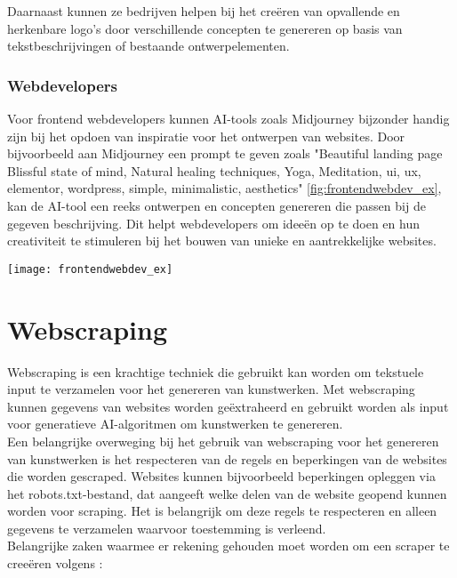 Daarnaast kunnen ze bedrijven helpen bij het creëren van opvallende en herkenbare logo's door verschillende concepten te genereren op basis van tekstbeschrijvingen of bestaande ontwerpelementen. 

\subsubsection{Webdevelopers}
Voor frontend webdevelopers kunnen AI-tools zoals Midjourney bijzonder handig zijn bij het opdoen van inspiratie voor het ontwerpen van websites. Door bijvoorbeeld aan Midjourney een prompt te geven zoals "Beautiful landing page Blissful state of mind, Natural healing techniques, Yoga, Meditation, ui, ux, elementor, wordpress, simple, minimalistic, aesthetics" \ref{fig:frontendwebdev_ex}, kan de AI-tool een reeks ontwerpen en concepten genereren die passen bij de gegeven beschrijving. Dit helpt webdevelopers om ideeën op te doen en hun creativiteit te stimuleren bij het bouwen van unieke en aantrekkelijke websites.

\begin{center}
    \texttt{[image: frontendwebdev\_ex]}
    \label{fig:frontendwebdev_ex}
\end{center}


\section{Webscraping}
\label{ch:liter_webscraping}
Webscraping is een krachtige techniek die gebruikt kan worden om tekstuele input te verzamelen voor het genereren van kunstwerken. Met webscraping kunnen gegevens van websites worden geëxtraheerd en gebruikt worden als input voor generatieve AI-algoritmen om kunstwerken te genereren. \\
 
Een belangrijke overweging bij het gebruik van webscraping voor het genereren van kunstwerken is het respecteren van de regels en beperkingen van de websites die worden gescraped. Websites kunnen bijvoorbeeld beperkingen opleggen via het robots.txt-bestand, dat aangeeft welke delen van de website geopend kunnen worden voor scraping. Het is belangrijk om deze regels te respecteren en alleen gegevens te verzamelen waarvoor toestemming is verleend. \\

Belangrijke zaken waarmee er rekening gehouden moet worden om een scraper te creeëren volgens \autocite{BIO2014}:

